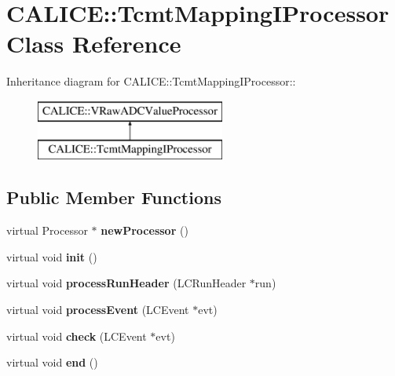 \section{CALICE::TcmtMappingIProcessor Class Reference}
\label{classCALICE_1_1TcmtMappingIProcessor}
Inheritance diagram for CALICE::TcmtMappingIProcessor::\begin{figure}[H]
\begin{center}
\leavevmode
\includegraphics[height=2cm]{classCALICE_1_1TcmtMappingIProcessor}
\end{center}
\end{figure}
\subsection*{Public Member Functions}
\begin{DoxyCompactItemize}
\item 
virtual Processor $\ast$ {\bfseries newProcessor} ()\label{classCALICE_1_1TcmtMappingIProcessor_af68eccae5145606b935a16cb3c17a23f}

\item 
virtual void {\bfseries init} ()\label{classCALICE_1_1TcmtMappingIProcessor_ab2aacaee87955c83ede7a99d5bdcf6f9}

\item 
virtual void {\bfseries processRunHeader} (LCRunHeader $\ast$run)\label{classCALICE_1_1TcmtMappingIProcessor_a57645dbfce4fa856af7e3095baf98ebc}

\item 
virtual void {\bfseries processEvent} (LCEvent $\ast$evt)\label{classCALICE_1_1TcmtMappingIProcessor_afebd6aa1a8d9fbf9ee73994bc055992d}

\item 
virtual void {\bfseries check} (LCEvent $\ast$evt)\label{classCALICE_1_1TcmtMappingIProcessor_a7300f0af5983855142d7a7305b871203}

\item 
virtual void {\bfseries end} ()\label{classCALICE_1_1TcmtMappingIProcessor_aa25fac7f90f23cca521b526f1dfdaf95}

\end{DoxyCompactItemize}
